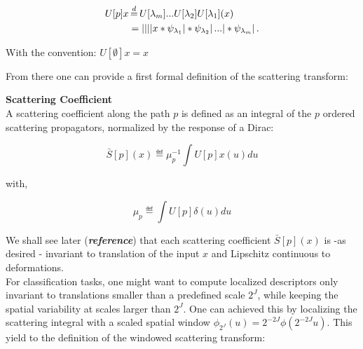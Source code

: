 \documentclass[a4paper,11pt]{report}
\begin{document}
{\begin{defn}
				\begin{equation}
					\label{eq:path ordered SP}
					\begin{split}
						U[p]x &\eqdef U[\lambda_{m}]...U[\lambda_{2}]U[\lambda_{1}](x) \\
							&= \abs{\abs{\abs{\abs{x \ast \psi_{\lambda_{1}}} \ast \psi_{\lambda_{2}}} 
							...} \ast \psi_{\lambda_{m}}}.   
					\end{split}
				\end{equation}
				
				With the convention: $U[\emptyset]x = x$\\
				\label{def:path ordered SO}
      \end{defn} 
      
      From there one can provide a first formal definition of the scattering transform:
      
      \begin{defn} \textbf{Scattering Coefficient}\\
				A scattering coefficient along the path $p$ is defined as an integral of the $p$ ordered scattering propagators, normalized by the response of a Dirac:

				\begin{equation}
					\label{eq:ST1}
					\bar{S}[p](x) \eqdef \mu_{p}^{-1} \int U[p]x(u) du
				\end{equation}
				
				with,
				
				\begin{equation*}
					\label{eq:ST normalization}
					\mu_{p} \eqdef \int U[p]\delta(u)du      
				\end{equation*}
				\label{def:SC}
      \end{defn}
      
      We shall see later (\textbf{\textit{reference}}) that each scattering coefficient $\bar{S}[p](x)$ is -as desired - invariant to translation of the input $x$ and Lipschitz continuous to deformations.\\
      
      For classification tasks, one might want to compute localized descriptors only invariant to translations smaller than a predefined scale $2^{J}$, while keeping the spatial variability at 
      scales larger than $2^{J}$. One can achieved this by localizing the scattering integral with a scaled spatial window $\phi_{2^{J}}(u) = 2^{-2J} \phi(2^{-2J}u)$. This yield to the definition of the windowed scattering transform:
      
}
\end{document}
